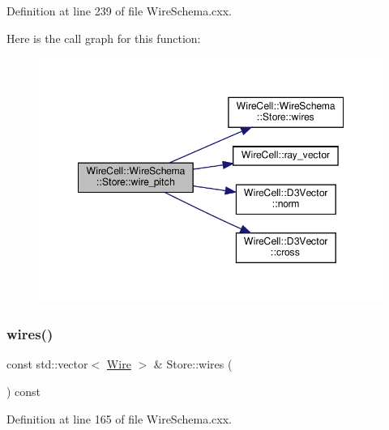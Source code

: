 Definition at line 239 of file Wire\+Schema.\+cxx.

Here is the call graph for this function\+:
\nopagebreak
\begin{figure}[H]
\begin{center}
\leavevmode
\includegraphics[width=348pt]{class_wire_cell_1_1_wire_schema_1_1_store_abc4cbd21498604e65dbb8753a437a2c2_cgraph}
\end{center}
\end{figure}
\mbox{\label{class_wire_cell_1_1_wire_schema_1_1_store_acdd83e45f8004e2ad4ac625d7fce47d3}} 
\subsubsection{\texorpdfstring{wires()}{wires()}\hspace{0.1cm}{\footnotesize\ttfamily [1/2]}}
{\footnotesize\ttfamily const std\+::vector$<$ \hyperlink{struct_wire_cell_1_1_wire_schema_1_1_wire}{Wire} $>$ \& Store\+::wires (\begin{DoxyParamCaption}{ }\end{DoxyParamCaption}) const}



Definition at line 165 of file Wire\+Schema.\+cxx.

